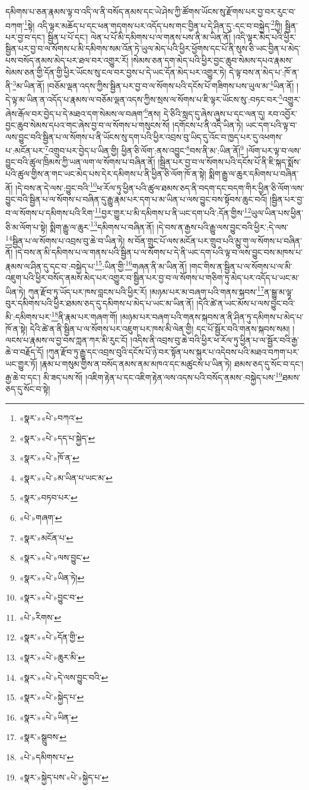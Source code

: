 དམིགས་པ་ཅན་རྣམས་ལྟ་བ་འདི་ལ་ནི་བསོད་ནམས་དང་ཡེ་ཤེས་ཀྱི་ཚོགས་ཡོངས་སུ་རྫོགས་པར་བྱ་བར་རུང་བ་བཀག་\footnote{«སྣར་»«པེ་»བཀའ་}སྟེ། འདི་ལྟར་མཆོད་པ་དང་ཕན་གདགས་པར་འདོད་པས་གང་བྱིན་པ་དེ་ཤིན་དུ་:དང་བ་བསྐྱེད་\footnote{«སྣར་»«པེ་»དད་པ་སྐྱེད་}ཀྱི། སྦྱིན་པར་བྱ་བ་དང་། སྦྱིན་པ་པོ་དང་། ལེན་པ་པོ་མི་དམིགས་པ་ལ་གནས་པས་ནི་མ་ཡིན་ནོ། །འདི་ལྟར་མེད་པའི་ཕྱིར་སྦྱིན་པར་བྱ་བ་ལ་སོགས་པ་མི་དམིགས་སམ་འོན་ཏེ་ཡུལ་མེད་པའི་ཕྱིར་ཕྱོགས་དང་པོ་ནི་སུས་ཅི་ཡང་བྱིན་པ་མེད་པས་བསོད་ནམས་མེད་པར་ཐལ་བར་འགྱུར་རོ། །སེམས་ཅན་དག་མེད་པའི་ཕྱིར་བྱང་ཆུབ་སེམས་དཔའ་རྣམས་སེམས་ཅན་གྱི་དོན་གྱི་ཕྱིར་ཡོངས་སུ་ངལ་བར་བྱས་པ་དེ་ཡང་དོན་མེད་པར་འགྱུར་ཏེ། དེ་ལྟ་བས་ན་མེད་པ་:ཁོ་ན་ནི་\footnote{«སྣར་»«པེ་»ཁོ་ན་}མ་ཡིན་ནོ། །བཅོམ་ལྡན་འདས་ཀྱིས་སྦྱིན་པར་བྱ་བ་ལ་སོགས་པའི་དངོས་པོ་གཟིགས་པས་ཡུལ་མ་\footnote{«སྣར་»«པེ་»མ་ཡིན་པ་ཡང་མ་}ཡིན་ནོ། །དེ་ལྟ་མ་ཡིན་ན་འདོད་པ་རྣམས་ལ་བཅོམ་ལྡན་འདས་ཀྱིས་སྲས་ལ་སོགས་པ་ཇི་ལྟར་ཡོངས་སུ་:བཏང་བར་\footnote{«སྣར་»བཏབ་པར་}འགྱུར་ཞེས་རྒོལ་བར་བྱེད་པ་དེ་མཐའ་དག་སེམས་ལ་བཞག་\footnote{«པེ་»གཞག་}ནས། དེ་ཅིའི་སླད་དུ་ཞེས་ཞུས་པ་དང་ལན་དུ། རབ་འབྱོར་བྱང་ཆུབ་སེམས་དཔའ་གང་ཞེས་བྱ་བ་ལ་སོགས་པ་གསུངས་སོ། །དགོངས་པ་ནི་འདི་ཡིན་ཏེ། ཡང་དག་པའི་ལྟ་བ་ལས་བྱུང་བའི་སྦྱིན་པ་ལ་སོགས་པ་ནི་ཡོངས་སུ་དག་པའི་ཕྱིར་འབྲས་བུ་ཡིད་དུ་འོང་བ་ཁྱད་པར་དུ་འཕགས་པ་:མངོན་པར་\footnote{«སྣར་»མངོན་པ་}འགྲུབ་པར་བྱེད་པ་ཡིན་གྱི། ཕྱིན་ཅི་ལོག་:ནས་འབྱུང་\footnote{«སྣར་»«པེ་»ལས་བྱུང་}བས་ནི་མ་:ཡིན་ནོ།\footnote{«སྣར་»«པེ་»ཡིན་ཏེ།} །ལོག་པར་ལྟ་བ་ལས་བྱུང་བའི་ཚུལ་ཁྲིམས་ཀྱི་ཡན་ལག་ལ་སོགས་པ་བཞིན་ནོ། །སྦྱིན་པར་བྱ་བ་ལ་སོགས་པའི་དངོས་པོ་ནི་ཇི་སྐད་སྨོས་པའི་ཚུལ་གྱིས་ན་གང་ཡང་མེད་པས་དེར་དམིགས་པ་ནི་ཕྱིན་ཅི་ལོག་ཁོ་ན་སྟེ། སྨིག་རྒྱུ་ལ་ཆུར་དམིགས་པ་བཞིན་ནོ། །དེ་བས་ན་དེ་ལས་:བྱུང་བའི་\footnote{«སྣར་»«པེ་»བྱུང་བ་}ཕ་རོལ་ཏུ་ཕྱིན་པའི་ཚུལ་ཐམས་ཅད་ནི་བདག་དང་བདག་གིར་ཕྱིན་ཅི་ལོག་ལས་བྱུང་བའི་སྦྱིན་པ་ལ་སོགས་པ་བཞིན་དུ་རྒྱུ་རྣམ་པར་དག་པ་མ་ཡིན་པ་ལས་བྱུང་བས་སྟོབས་ཆུང་བའོ། །སྦྱིན་པར་བྱ་བ་ལ་སོགས་པ་དམིགས་པའི་རིག་\footnote{«པེ་»རིགས་}བྱར་གྱུར་པ་མི་དམིགས་པ་ནི་ཡང་དག་པའི་:དོན་གྱིས་\footnote{«སྣར་»«པེ་»དོན་གྱི་}ཡུལ་ཡིན་པས་ཕྱིན་ཅི་མ་ལོག་པ་སྟེ། སྨིག་རྒྱུ་ལ་ཆུར་\footnote{«སྣར་»«པེ་»ཆུར་མི་}དམིགས་པ་བཞིན་ནོ། །དེ་བས་ན་རྒྱས་པའི་རྒྱུ་ལས་བྱུང་བའི་ཕྱིར་:དེ་ལས་\footnote{«སྣར་»«པེ་»དེ་ལས་བྱུང་བའི་}སྦྱིན་པ་ལ་སོགས་པ་འབྲས་བུ་ཆེ་བ་ཡིན་ཏེ། ས་བོན་གྲུང་པོ་ལས་མངོན་པར་གྲུབ་པའི་མྱུ་གུ་ལ་སོགས་པ་བཞིན་ནོ། །དེ་བས་ན་མི་དམིགས་པ་ལ་གནས་པའི་སྦྱིན་པ་ལ་སོགས་པ་དེ་ནི་ཡང་དག་པའི་ལྟ་བ་ལས་བྱུང་བས་མཁས་པ་རྣམས་ལ་ཤིན་དུ་དང་བ་:བསྐྱེད་པ་\footnote{«སྣར་»«པེ་»སྐྱེད་པ་}:ཡིན་གྱི་\footnote{«སྣར་»«པེ་»ཡིན་}གཞན་ནི་མ་ཡིན་ནོ། །གང་གིས་ན་སྦྱིན་པ་ལ་སོགས་པ་ལ་མི་འཇུག་པའི་ཕྱིར་བསོད་ནམས་མེད་པར་འགྱུར་བ་སྦྱིན་པར་བྱ་བ་ལ་སོགས་པ་གཅིག་ཏུ་མེད་པར་འདོད་པ་ཡང་མ་ཡིན་ཏེ། ཀུན་རྫོབ་ཏུ་ཡོད་པར་ཁས་བླངས་པའི་ཕྱིར་རོ། །མཉམ་པར་མ་བཞག་པའི་གནས་སྐབས་\footnote{«སྣར་»སྒྲུབས་}ན་སྒྱུ་མ་ལྟ་བུར་དམིགས་པའི་ཕྱིར་ཐམས་ཅད་དུ་དམིགས་པ་མེད་པ་ཡང་མ་ཡིན་ནོ། །དེའི་ཚེ་ན་ཡང་མོས་པ་ལས་བྱུང་བའི་མི་:དམིགས་པར་\footnote{«པེ་»དམིགས་པ་}ནི་རྣམ་པར་གཞག་གོ། །མཉམ་པར་བཞག་པའི་གནས་སྐབས་ན་ནི་ཤིན་ཏུ་དམིགས་པ་མེད་པ་ཁོ་ན་སྟེ། དེའི་ཚེ་ན་ནི་སྦྱིན་པ་ལ་སོགས་པར་འཇུག་པར་ཁས་མི་ལེན་གྱི། དང་པོ་སྦྱོར་བའི་གནས་སྐབས་སམ། །ལངས་པ་རྣམས་ལ་བྱ་བས་ཀླན་ཀར་མི་རུང་ངོ། །འདིས་ནི་འབྲས་བུ་ཆེ་བའི་ཕྱིར་ཕ་རོལ་ཏུ་ཕྱིན་པ་ལ་སྦྱོར་བའི་རྒྱ་ཆེ་བ་བརྗོད་དོ། །ཀུན་རྫོབ་ཏུ་རྒྱུ་དང་འབྲས་བུའི་དངོས་པོ་ཉེ་བར་སྟོན་པས་སྐུར་པ་འདེབས་པའི་མཐའ་བཀག་པར་ཡང་གྱུར་ཏོ། །རྣམ་པ་གསུམ་གྱིས་ན་བསོད་ནམས་ནམ་མཁའ་དང་མཚུངས་པ་ཡིན་ཏེ། ཐམས་ཅད་དུ་སོང་བ་དང་། རྒྱ་ཆེ་བ་དང་། མི་ཟད་པས་སོ། །འཇིག་རྟེན་པ་དང་འཇིག་རྟེན་ལས་འདས་པའི་བསོད་ནམས་:བསྐྱེད་པས་\footnote{«སྣར་»སྐྱེད་པས་«པེ་»སྐྱེད་པ་}ཐམས་ཅད་དུ་སོང་བ་སྟེ། 